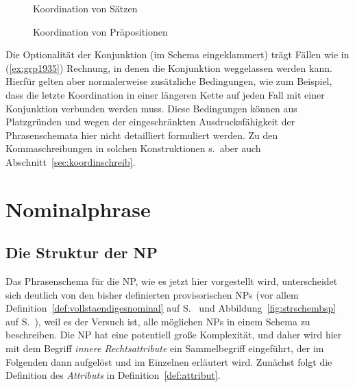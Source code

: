 \begin{figure}
  \centering
  \caption{Koordination von Sätzen}
  \label{fig:koorsatz}
\end{figure}

\begin{figure}
  \centering
  \caption{Koordination von Präpositionen}
  \label{fig:koorpraep}
\end{figure}

Die Optionalität der Konjunktion (im Schema eingeklammert) trägt Fällen wie in (\ref{ex:grp1935}) Rechnung, in denen die Konjunktion weggelassen werden kann.
Hierfür gelten aber normalerweise zusätzliche Bedingungen, wie zum Beispiel, dass die letzte Koordination in einer längeren Kette auf jeden Fall mit einer Konjunktion verbunden werden muss.
Diese Bedingungen können aus Platzgründen und wegen der eingeschränkten Ausdrucksfähigkeit der Phrasenschemata hier nicht detailliert formuliert werden.
Zu den Kommaschreibungen in solchen Konstruktionen s.\ aber auch Abschnitt~\ref{sec:koordinschreib}.

\begin{exe}
\end{exe}

\section{Nominalphrase}

\label{sec:ngr}

\subsection{Die Struktur der NP}

Das Phrasenschema für die NP, wie es jetzt hier vorgestellt wird, unterscheidet sich deutlich von den bisher definierten provisorischen NPs (vor allem Definition~\ref{def:vollstaendigesnominal} auf S.~\pageref{def:vollstaendigesnominal} und Abbildung~\ref{fig:strschembsp} auf S.~\pageref{fig:strschembsp}), weil es der Versuch ist, alle möglichen NPs in einem Schema zu beschreiben.
Die NP hat eine potentiell große Komplexität, und daher wird hier mit dem Begriff \textit{innere Rechtsattribute} ein Sammelbegriff eingeführt, der im Folgenden dann aufgelöst und im Einzelnen erläutert wird.
Zunächst folgt die Definition des \textit{Attributs} in Definition~\ref{def:attribut}.

